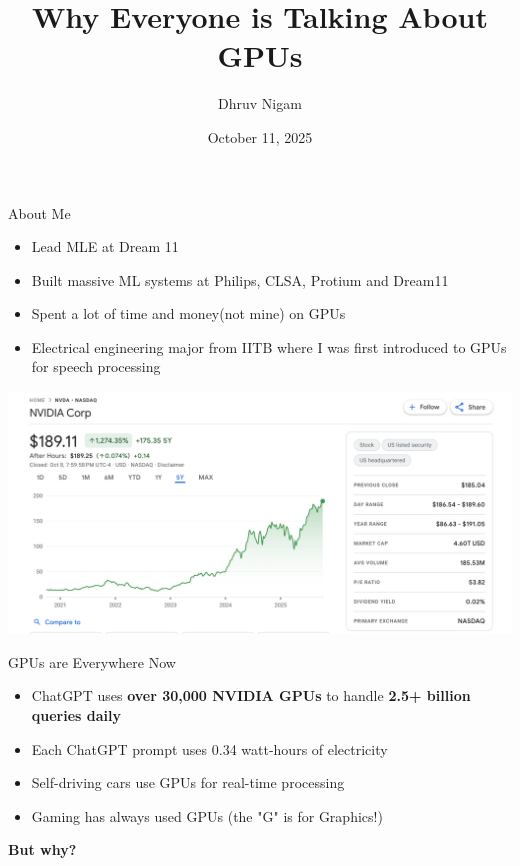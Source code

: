 \documentclass[10pt]{beamer}
\title{Why Everyone is Talking About GPUs}
\date{October 11, 2025}
\author{Dhruv Nigam}
\institute{MumPy Meetup}
\begin{document}
\maketitle

\begin{frame}{About Me}
  \begin{itemize}
    \item Lead MLE at Dream 11
    \item Built massive ML systems at Philips, CLSA, Protium and Dream11
    \item Spent a lot of time and money(not mine) on GPUs
    \item Electrical engineering major from IITB where I was first introduced to GPUs for speech processing
  \end{itemize}
  
\end{frame}

\begin{frame}[plain]
  \begin{center}
    \includegraphics[width=1.0\textwidth,height=1.2\textheight,keepaspectratio]{images/nvidia_stock.png}
  \end{center}
\end{frame}

\begin{frame}{GPUs are Everywhere Now}
  \begin{itemize}
    \item ChatGPT uses \textbf{over 30,000 NVIDIA GPUs} to handle \textbf{2.5+ billion queries daily}
    \item Each ChatGPT prompt uses 0.34 watt-hours of electricity
    \item Self-driving cars use GPUs for real-time processing
    \item Gaming has always used GPUs (the "G" is for Graphics!)
  \end{itemize}
  
  \vspace{1em}
  \Large \textbf{But why?}
\end{frame}
\end{document}
